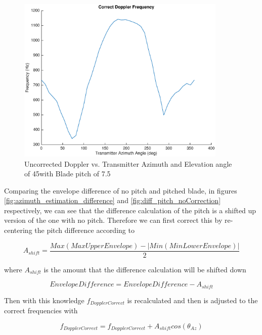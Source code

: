 \begin{figure}
	\begin{center}
		\includegraphics[width=10cm]{images/results/correct_dop_pitch_noCorrection.eps}
		\caption{Uncorrected Doppler vs. Transmitter Azimuth and Elevation angle of 45\textdegree with Blade pitch of 7.5\textdegree}
		\label{fig:dop_pitch_noCorrection}
	\end{center}
\end{figure}

Comparing the envelope difference of no pitch and pitched blade, in figures \ref{fig:azimuth_estimation_difference} and \ref{fig:diff_pitch_noCorrection} respectively, we can see that the difference calculation of the pitch is a shifted up version of the one with no pitch. Therefore we can first correct this by re-centering the pitch difference according to 

\begin{equation}
	A_{shift} = \frac{Max(Max Uppe rEnvelope) - |Min(Min Lower Envelope)|}{2}
	\label{eqn:pitch_shift}
\end{equation}

where $A_{shift}$ is the amount that the difference calculation will be shifted down

\begin{equation}
	EnvelopeDifference = EnvelopeDifference - A_{shift}
	\label{eqn:diff_shift}
\end{equation}

Then with this knowledge $f_{DopplerCorrect}$ is recalculated and then is adjusted to the correct frequencies with

\begin{equation}
	f_{DopplerCorrect} = f_{DopplerCorrect} + A_{shift}cos\left(\theta_{Az}\right)
	\label{eqn:fd_max}
\end{equation}

